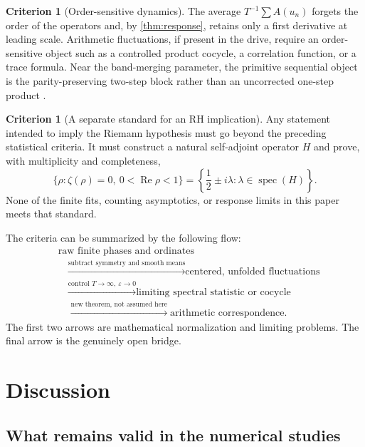 \documentclass[11pt]{article}
\theoremstyle{definition}
\newtheorem{criterion}[theorem]{Criterion}
\theoremstyle{remark}
\newcommand{\spec}{\operatorname{spec}}
\begin{document}
\begin{criterion}[Order-sensitive dynamics]\label{crit:order}
The average $T^{-1}\sum A(u_n)$ forgets the order of the operators and, by \cref{thm:response}, retains only a first derivative at leading scale.  Arithmetic fluctuations, if present in the drive, require an order-sensitive object such as a controlled product cocycle, a correlation function, or a trace formula.  Near the band-merging parameter, the primitive sequential object is the parity-preserving two-step block rather than an uncorrected one-step product \citep{WangParity2026}.
\end{criterion}

\begin{criterion}[A separate standard for an RH implication]\label{crit:rh}
Any statement intended to imply the Riemann hypothesis must go beyond the preceding statistical criteria.  It must construct a natural self-adjoint operator $H$ and prove, with multiplicity and completeness,
\[
    \{\rho:\zeta(\rho)=0,\ 0<\operatorname{Re}\rho<1\}
    =\left\{\frac12\pm i\lambda:
      \lambda\in\spec(H)\right\}.
\]
None of the finite fits, counting asymptotics, or response limits in this paper meets that standard.
\end{criterion}

The criteria can be summarized by the following flow:
\[
\begin{aligned}
&\text{raw finite phases and ordinates}\\[-0.1em]
&\quad\xrightarrow{\text{subtract symmetry and smooth means}}
  \text{centered, unfolded fluctuations}\\[0.2em]
&\quad\xrightarrow{\text{control }T\to\infty,\ \varepsilon\to0}
  \text{limiting spectral statistic or cocycle}\\[0.2em]
&\quad\xrightarrow{\text{new theorem, not assumed here}}
  \text{arithmetic correspondence}.
\end{aligned}
\]
The first two arrows are mathematical normalization and limiting problems.  The final arrow is the genuinely open bridge.

\section{Discussion}\label{sec:discussion}

\subsection{What remains valid in the numerical studies}
\end{document}
